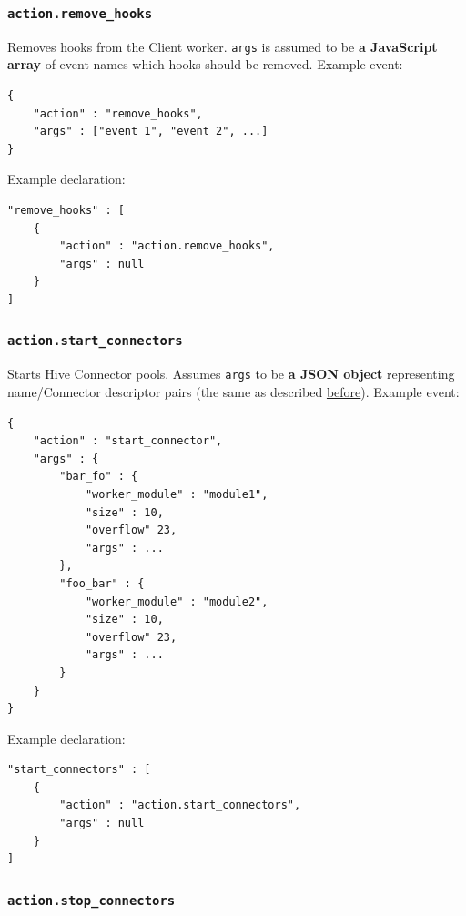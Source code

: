 \documentclass[a4paper]{article}
\begin{document}
\subsubsection{\texttt{action.remove\_hooks}}
\label{sec-8-3-7}

Removes hooks from the Client worker. \texttt{args} is assumed to be \textbf{a JavaScript array} of event names which hooks should be removed. Example event:

\begin{verbatim}
{
    "action" : "remove_hooks",
    "args" : ["event_1", "event_2", ...]
}
\end{verbatim}




\noindent
Example declaration:

\begin{verbatim}
"remove_hooks" : [
    {
        "action" : "action.remove_hooks",
        "args" : null
    }
]
\end{verbatim}
\subsubsection{\texttt{action.start\_connectors}}
\label{sec-8-3-8}

Starts Hive Connector pools. Assumes \texttt{args} to be \textbf{a JSON object} representing name/Connector descriptor pairs (the same as described \hyperref[ref-connectors_config]{before}). Example event:


\begin{verbatim}
{
    "action" : "start_connector",
    "args" : {
        "bar_fo" : {
            "worker_module" : "module1",
            "size" : 10,
            "overflow" 23,
            "args" : ...
        },
        "foo_bar" : {
            "worker_module" : "module2",
            "size" : 10,
            "overflow" 23,
            "args" : ...
        }
    }
}
\end{verbatim}




\noindent
Example declaration:

\begin{verbatim}
"start_connectors" : [
    {
        "action" : "action.start_connectors",
        "args" : null
    }
]
\end{verbatim}
\subsubsection{\texttt{action.stop\_connectors}}
\label{sec-8-3-9}
\end{document}
